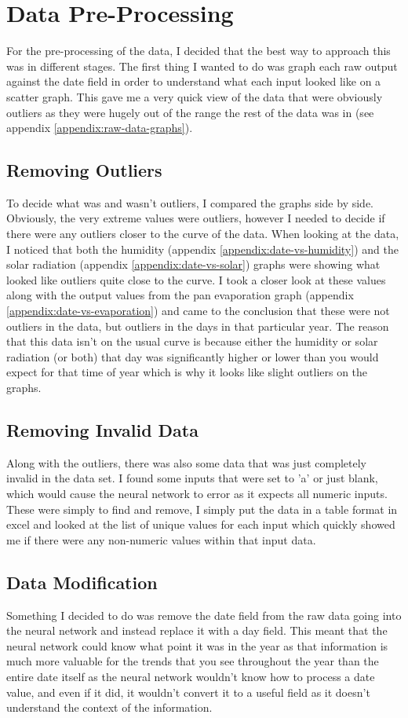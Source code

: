 \documentclass[10pt, a4paper]{article}
\begin{document}
\section{Data Pre-Processing}
For the pre-processing of the data, I decided that the best way to approach this was in different stages. The first thing I wanted to do was graph each raw output against the date field in order to understand what each input looked like on a scatter graph. This gave me a very quick view of the data that were obviously outliers as they were hugely out of the range the rest of the data was in (see appendix \ref{appendix:raw-data-graphs}).

\subsection{Removing Outliers}
To decide what was and wasn't outliers, I compared the graphs side by side. Obviously, the very extreme values were outliers, however I needed to decide if there were any outliers closer to the curve of the data. When looking at the data, I noticed that both the humidity (appendix \ref{appendix:date-vs-humidity}) and the solar radiation (appendix \ref{appendix:date-vs-solar}) graphs were showing what looked like outliers quite close to the curve. I took a closer look at these values along with the output values from the pan evaporation graph (appendix \ref{appendix:date-vs-evaporation}) and came to the conclusion that these were not outliers in the data, but outliers in the days in that particular year. The reason that this data isn't on the usual curve is because either the humidity or solar radiation (or both) that day was significantly higher or lower than you would expect for that time of year which is why it looks like slight outliers on the graphs.

\subsection{Removing Invalid Data}
Along with the outliers, there was also some data that was just completely invalid in the data set. I found some inputs that were set to 'a' or just blank, which would cause the neural network to error as it expects all numeric inputs. These were simply to find and remove, I simply put the data in a table format in excel and looked at the list of unique values for each input which quickly showed me if there were any non-numeric values within that input data.

\subsection{Data Modification}
Something I decided to do was remove the date field from the raw data going into the neural network and instead replace it with a day field. This meant that the neural network could know what point it was in the year as that information is much more valuable for the trends that you see throughout the year than the entire date itself as the neural network wouldn't know how to process a date value, and even if it did, it wouldn't convert it to a useful field as it doesn't understand the context of the information.
\end{document}
